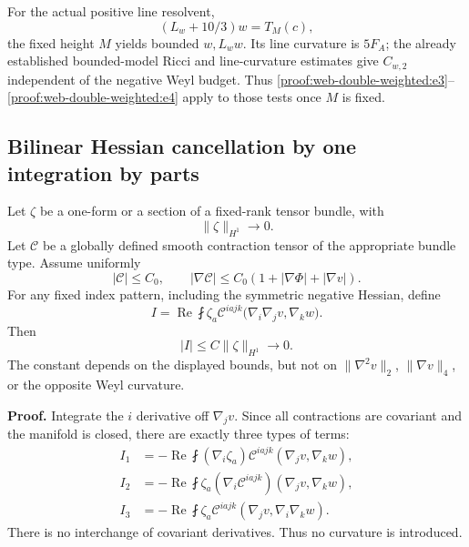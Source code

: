 For the actual positive line resolvent, \[
(L_w+10/3)w=T_M(c),
\] the fixed height \(M\) yields bounded \(w,L_ww\). Its line curvature is \(5F_A\); the already established bounded-model Ricci and line-curvature estimates give \(C_{w,2}\) independent of the negative Weyl budget. Thus \eqref{proof:web-double-weighted:e3}–\eqref{proof:web-double-weighted:e4} apply to those tests once \(M\) is fixed.

\hypertarget{proof:web-double-weighted:s3}{%
\subsection{Bilinear Hessian cancellation by one integration by parts}\label{proof:web-double-weighted:s3}}

Let \(\zeta\) be a one-form or a section of a fixed-rank tensor bundle, with \[
\|\zeta\|_{H^1}\to0.
\] Let \(\mathcal C\) be a globally defined smooth contraction tensor of the appropriate bundle type. Assume uniformly \[
|\mathcal C|\le C_0,
\qquad
|\nabla\mathcal C|\le C_0(1+|\nabla\Phi|+|\nabla v|).
\tag{\thesection.5}\label{proof:web-double-weighted:e5}
\] For any fixed index pattern, including the symmetric negative Hessian, define \[
I=\operatorname{Re}\fint
\zeta_a\mathcal C^{iajk}\bigl(\nabla_i\nabla_jv,\nabla_kw\bigr).
\] Then \[
\boxed{|I|\le C\|\zeta\|_{H^1}\longrightarrow0.}
\tag{\thesection.6}\label{proof:web-double-weighted:e6}
\] The constant depends on the displayed bounds, but not on \(\|\nabla^2v\|_2\), \(\|\nabla v\|_4\), or the opposite Weyl curvature.

\textbf{Proof.} Integrate the \(i\) derivative off \(\nabla_jv\). Since all contractions are covariant and the manifold is closed, there are exactly three types of terms: \[
\begin{aligned}
I_1&=-\operatorname{Re}\fint(\nabla_i\zeta_a)\mathcal C^{iajk}
 (\nabla_jv,\nabla_kw),\\
I_2&=-\operatorname{Re}\fint\zeta_a(\nabla_i\mathcal C^{iajk})
 (\nabla_jv,\nabla_kw),\\
I_3&=-\operatorname{Re}\fint\zeta_a\mathcal C^{iajk}
 (\nabla_jv,\nabla_i\nabla_kw).
\end{aligned}
\] There is no interchange of covariant derivatives. Thus no curvature is introduced.

